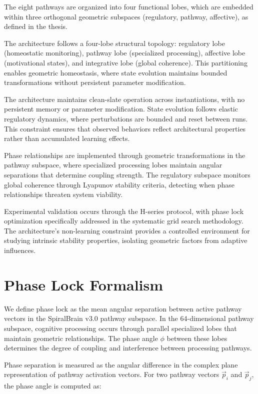\documentclass[12pt,a4paper]{report}
\begin{document}
The eight pathways are organized into four functional lobes, which are embedded within three orthogonal geometric subspaces (regulatory, pathway, affective), as defined in the thesis.

The architecture follows a four-lobe structural topology: regulatory lobe (homeostatic monitoring), pathway lobe (specialized processing), affective lobe (motivational states), and integrative lobe (global coherence). This partitioning enables geometric homeostasis, where state evolution maintains bounded transformations without persistent parameter modification.

The architecture maintains clean-slate operation across instantiations, with no persistent memory or parameter modification. State evolution follows elastic regulatory dynamics, where perturbations are bounded and reset between runs. This constraint ensures that observed behaviors reflect architectural properties rather than accumulated learning effects.

Phase relationships are implemented through geometric transformations in the pathway subspace, where specialized processing lobes maintain angular separations that determine coupling strength. The regulatory subspace monitors global coherence through Lyapunov stability criteria, detecting when phase relationships threaten system viability.

Experimental validation occurs through the H-series protocol, with phase lock optimization specifically addressed in the systematic grid search methodology. The architecture's non-learning constraint provides a controlled environment for studying intrinsic stability properties, isolating geometric factors from adaptive influences.

\section{Phase Lock Formalism}

We define phase lock as the mean angular separation between active pathway vectors in the SpiralBrain v3.0 pathway subspace. In the 64-dimensional pathway subspace, cognitive processing occurs through parallel specialized lobes that maintain geometric relationships. The phase angle $\phi$ between these lobes determines the degree of coupling and interference between processing pathways.

Phase separation is measured as the angular difference in the complex plane representation of pathway activation vectors. For two pathway vectors $\vec{p}_i$ and $\vec{p}_j$, the phase angle is computed as:
\end{document}
